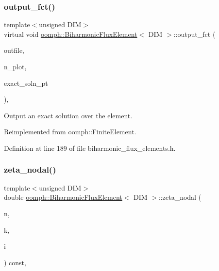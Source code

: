 \subsubsection{\texorpdfstring{output\+\_\+fct()}{output\_fct()}}
{\footnotesize\ttfamily template$<$unsigned D\+IM$>$ \\
virtual void \hyperlink{classoomph_1_1BiharmonicFluxElement}{oomph\+::\+Biharmonic\+Flux\+Element}$<$ D\+IM $>$\+::output\+\_\+fct (\begin{DoxyParamCaption}\item[{std\+::ostream \&}]{outfile,  }\item[{const unsigned \&}]{n\+\_\+plot,  }\item[{\hyperlink{classoomph_1_1FiniteElement_a690fd33af26cc3e84f39bba6d5a85202}{Finite\+Element\+::\+Steady\+Exact\+Solution\+Fct\+Pt}}]{exact\+\_\+soln\+\_\+pt }\end{DoxyParamCaption})\hspace{0.3cm}{\ttfamily [inline]}, {\ttfamily [virtual]}}



Output an exact solution over the element. 



Reimplemented from \hyperlink{classoomph_1_1FiniteElement_a22b695c714f60ee6cd145be348042035}{oomph\+::\+Finite\+Element}.



Definition at line 189 of file biharmonic\+\_\+flux\+\_\+elements.\+h.

\mbox{\label{classoomph_1_1BiharmonicFluxElement_af4c405bca7989f8609926279fdf09f0f}} 
\subsubsection{\texorpdfstring{zeta\+\_\+nodal()}{zeta\_nodal()}}
{\footnotesize\ttfamily template$<$unsigned D\+IM$>$ \\
double \hyperlink{classoomph_1_1BiharmonicFluxElement}{oomph\+::\+Biharmonic\+Flux\+Element}$<$ D\+IM $>$\+::zeta\+\_\+nodal (\begin{DoxyParamCaption}\item[{const unsigned \&}]{n,  }\item[{const unsigned \&}]{k,  }\item[{const unsigned \&}]{i }\end{DoxyParamCaption}) const\hspace{0.3cm}{\ttfamily [inline]}, {\ttfamily [virtual]}}



